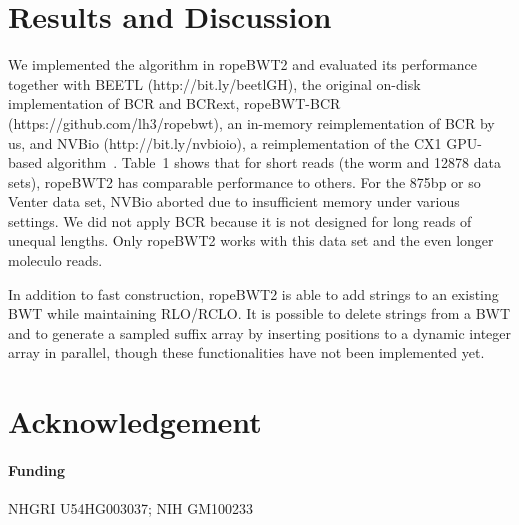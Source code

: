 \documentclass{bioinfo}
\begin{document}
\vspace*{-1em}
\section{Results and Discussion}
We implemented the algorithm in ropeBWT2 and evaluated its performance
together with BEETL (http://bit.ly/beetlGH), the original on-disk
implementation of BCR and BCRext, ropeBWT-BCR (https://github.com/lh3/ropebwt),
an in-memory reimplementation of BCR by us, and NVBio (http://bit.ly/nvbioio), a
reimplementation of the CX1 GPU-based algorithm~\citep{DBLP:journals/corr/LiuLL14}.
Table~1 shows that for short reads (the worm and 12878 data sets), ropeBWT2 has comparable performance to
others. For the 875bp or so Venter data set, NVBio aborted due to insufficient
memory under various settings. We did not apply BCR because it is not designed
for long reads of unequal lengths. Only ropeBWT2 works with this data set and
the even longer moleculo reads.

In addition to fast construction, ropeBWT2 is able to add strings
to an existing BWT while maintaining RLO/RCLO. It is possible to delete
strings from a BWT and to generate a sampled suffix array by inserting
positions to a dynamic integer array in parallel, though these functionalities
have not been implemented yet.

\vspace*{-1em}
\section*{Acknowledgement}
\paragraph{Funding\textcolon} NHGRI U54HG003037; NIH GM100233


\end{document}
